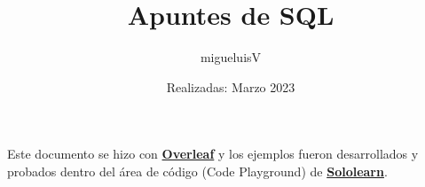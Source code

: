 \documentclass[12pt]{article}
\title{Apuntes de SQL}
\author{migueluisV}
\date{Realizadas: Marzo 2023}
\begin{document}
\renewcommand*\contentsname{Índice}
\renewcommand{\listtablename}{Índice de Tablas}
\renewcommand{\listfigurename}{Índice de Figuras}

\maketitle\newpage
\tableofcontents\newpage
\listoffigures\newpage
\listoftables\newpage

\hspace{0.55cm}Este documento se hizo con \href{https://es.overleaf.com/}{\textbf{Overleaf}} y los ejemplos fueron desarrollados y probados dentro del área de código (Code Playground) de \href{https://www.sololearn.com/}{\textbf{Sololearn}}.









\end{document}
